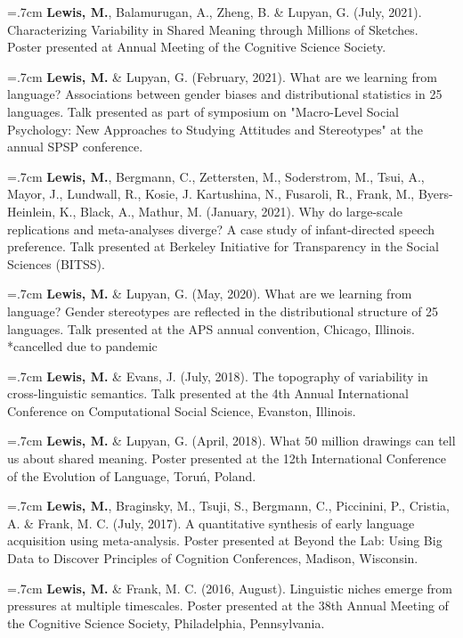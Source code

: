 \documentclass[letterpaper]{article}
\begin{document}
      \hangindent=.7cm {\bf Lewis, M.},  Balamurugan, A., Zheng, B. \& Lupyan, G. (July, 2021). Characterizing Variability in Shared Meaning through Millions of Sketches.  Poster presented at  Annual Meeting of the Cognitive Science Society.
      

 \hangindent=.7cm {\bf Lewis, M.} \& Lupyan, G. (February, 2021). What are we learning from language? Associations between gender biases and distributional statistics in 25 languages.  Talk presented as part of symposium on "Macro-Level Social Psychology: New Approaches to Studying Attitudes and Stereotypes" at the annual SPSP conference. 

 \hangindent=.7cm {\bf Lewis, M.}, Bergmann, C., Zettersten, M., Soderstrom, M., Tsui, A., Mayor, J., Lundwall, R., Kosie, J. Kartushina, N., Fusaroli, R., Frank, M., Byers-Heinlein, K., Black, A., Mathur, M. (January, 2021). Why do large-scale replications and meta-analyses diverge? A case study of infant-directed speech preference. Talk presented at Berkeley Initiative for Transparency in the Social Sciences (BITSS). 

 \hangindent=.7cm {\bf Lewis, M.} \& Lupyan, G. (May, 2020). What are we learning from language? Gender stereotypes are reflected in the distributional structure of 25 languages. Talk presented at the APS annual convention, Chicago, Illinois. *cancelled due to pandemic


 \hangindent=.7cm {\bf Lewis, M.} \& Evans, J. (July, 2018). The topography of variability in cross-linguistic semantics. Talk presented at the 4th Annual International Conference on Computational Social Science, Evanston, Illinois.

 \hangindent=.7cm {\bf Lewis, M.} \& Lupyan, G. (April, 2018). What 50 million drawings can tell us about shared meaning. Poster presented at the 12th International Conference of the Evolution of Language, Toru\'{n}, Poland.

 \hangindent=.7cm {\bf Lewis, M.}, Braginsky, M., Tsuji, S., Bergmann, C., Piccinini, P., Cristia, A. \& Frank, M. C. (July, 2017). A quantitative synthesis of early language acquisition using meta-analysis. Poster presented at Beyond the Lab: Using Big Data to Discover Principles of Cognition Conferences, Madison, Wisconsin.

\hangindent=.7cm {\bf Lewis, M.} \& Frank, M. C. (2016, August).  Linguistic niches emerge from pressures at multiple timescales. Poster presented at the 38th Annual Meeting of the Cognitive Science Society, Philadelphia, Pennsylvania.
\end{document}
